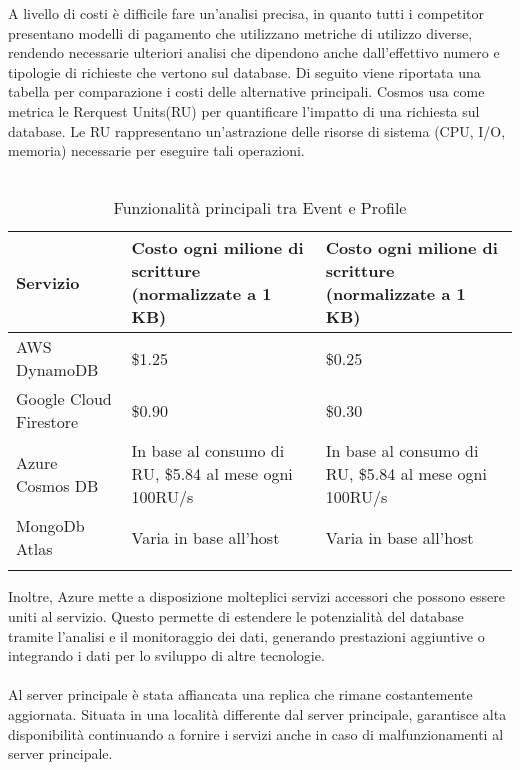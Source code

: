 A livello di costi è difficile fare un'analisi precisa,
in quanto tutti i competitor presentano modelli di pagamento che utilizzano metriche di utilizzo diverse,
rendendo necessarie ulteriori analisi che dipendono anche 
dall'effettivo numero e tipologie di richieste che vertono sul database.
Di seguito viene riportata una tabella per comparazione i costi delle alternative principali.
Cosmos usa come metrica le Rerquest Units(RU) per quantificare l'impatto di una richiesta sul database.
Le RU rappresentano un'astrazione delle risorse di sistema (CPU, I/O, memoria) necessarie per eseguire tali operazioni.\\
\\
\begin{longtable}{|P{9.5cm}|P{2.5cm}|P{2.5cm}|}
    \hline
    \textbf{Servizio} & \textbf{Costo ogni milione di scritture (normalizzate a 1 KB) }                                                 & \textbf{Costo ogni milione di scritture (normalizzate a 1 KB) }\\
    \hline
    AWS DynamoDB               & \$1.25                            & \$0.25                     \\
    \hline
    Google Cloud Firestore         & \$0.90                     & \$0.30                    \\
    \hline
    Azure Cosmos DB      & In base al consumo di RU, \$5.84 al mese ogni 100RU/s    & In base al consumo di RU, \$5.84 al mese ogni 100RU/s                       \\
    \hline
    MongoDb Atlas       & Varia in base all'host                          & Varia in base all'host                    \\
    \hline
    \caption{Funzionalità principali tra Event e Profile}
\end{longtable}

Inoltre, Azure mette a disposizione molteplici servizi accessori che possono essere uniti al servizio. 
Questo permette di estendere le potenzialità del database tramite  l’analisi e il monitoraggio dei dati, 
generando prestazioni aggiuntive o integrando i dati per lo sviluppo di altre tecnologie.\\
\\

Al server principale è stata affiancata una replica che rimane costantemente aggiornata. 
Situata in una località differente dal server principale, 
garantisce alta disponibilità continuando a fornire i servizi anche in caso di malfunzionamenti al server principale.\\
\\

